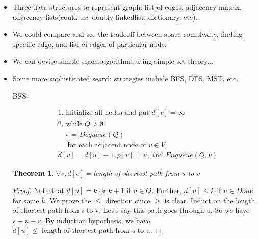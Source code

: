 \documentclass{article}
\newtheorem{theorem}{Theorem}
\theoremstyle{remark}
\begin{document}
\begin{itemize}
\item Three data structures to represent graph: list of edges, 
adjacency matrix, adjacency lists(could use doubly linkedlist, dictionary, etc). 
\item We could compare and see the tradeoff between 
space complexity, finding specific edge, and list 
of edges of particular node.
\item We can devise simple seach algorithms using simple set theory...
\item Some more sophisticated search strategies include BFS, DFS, MST, etc.
\begin{algorithm}[H]
\caption{BFS}
\begin{align*}
&\text{1. initialize all nodes and put }d[v]=\infty \\
&\text{2. while }Q\neq \emptyset \\
& \quad \text{v = }Dequeue(Q) \\
& \quad\text{ for each adjacent node of }v\in V, \\
& d[v]=d[u]+1, p[v] = u\text{, and }Enqueue(Q,v)
\end{align*}
\end{algorithm}
\begin{theorem}
$\forall v, d[v]=$length of shortest path from $s$ to $v$
\end{theorem}
\begin{proof}
Note that $d[u]=k$ or $k+1$ if $u\in Q$. Further, $d[u]\leq k$ if $u\in Done$ for some $k$.
We prove the $\leq$ direction since $\geq$ is clear. Induct on the length of
shortest path from s to v. Let's say this path goes through u. So we have $s-u-v$. By induction
hypothesis, we have $d[u]\leq \text{ length of shortest path from s to u}$.


\end{proof}
\end{itemize}
\end{document}
